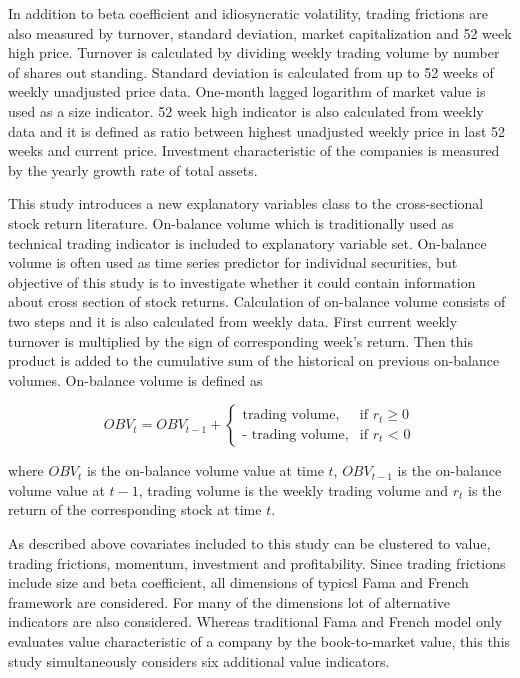 \documentclass{article}
\begin{document}
In addition to beta coefficient and idiosyncratic volatility, trading frictions are also measured by turnover, standard deviation, market capitalization and 52 week high price. Turnover is calculated by dividing weekly trading volume by number of shares out standing. Standard deviation is calculated from up to 52 weeks of weekly unadjusted price data. One-month lagged logarithm of market value is used as a size indicator. 52 week high indicator is also calculated from weekly data and it is defined as ratio between highest unadjusted weekly price in last 52 weeks and current price. Investment characteristic of the companies is measured by the yearly growth rate of total assets. \par

This study introduces a new explanatory variables class to the cross-sectional stock return literature. On-balance volume which is traditionally used as technical trading indicator is included to explanatory variable set. On-balance volume is often used as time series predictor for individual securities, but objective of this study is to investigate whether it could contain information about cross section of stock returns. Calculation of on-balance volume consists of two steps and it is also calculated from weekly data. First current weekly turnover is multiplied by the sign of corresponding week's return. Then this product is added to the cumulative sum of the historical on previous on-balance volumes. On-balance volume is defined as \par

\begin{equation}
\label{eq:OBV}
OBV_t = OBV_{t-1} + 
\begin{cases}
    \text{trading volume}, 	& \text{if $r_t$} \geq \text{0}\\
    \text{- trading volume},	& \text{if $r_t$ < 0}
\end{cases}
\end{equation}

where $OBV_t$ is the on-balance volume value at time $t$, $OBV_{t-1}$ is the on-balance volume value at $t-1$, trading volume is the weekly trading volume and $r_t$ is the return of the corresponding stock at time $t$. \par

As described above covariates included to this study can be clustered to value, trading frictions, momentum, investment and profitability. Since trading frictions include size and beta coefficient, all dimensions of typicsl Fama and French framework are considered. For many of the dimensions lot of alternative indicators are also considered. Whereas traditional Fama and French \citeyear{FAMA19933} model only evaluates value characteristic of a company by the book-to-market value, this this study simultaneously considers six additional value indicators. \par
\end{document}
